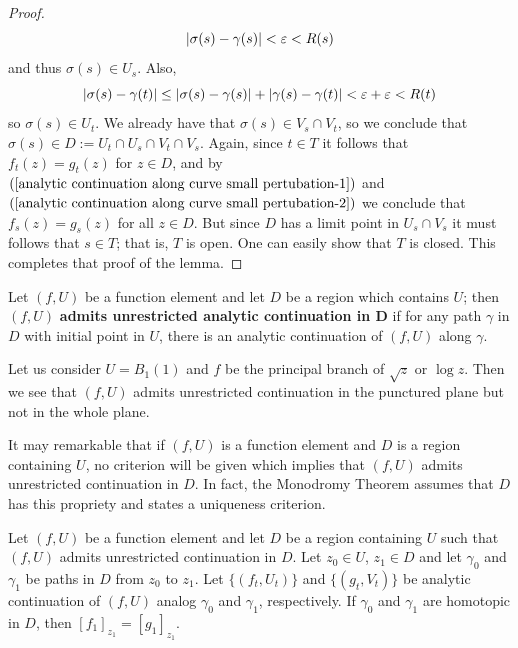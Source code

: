 \begin{proof}
\[|\sigma(s)-\gamma(s)|<\varepsilon<R(s)\]
and thus $\sigma(s)\in U_s$. Also,
\[|\sigma(s)-\gamma(t)|\leq|\sigma(s)-\gamma(s)|+|\gamma(s)-\gamma(t)|<\varepsilon+\varepsilon<R(t)\]
so $\sigma(s)\in U_t$. We already have that $\sigma(s)\in V_s\cap V_t$, so we conclude that $\sigma(s)\in D:=U_t\cap U_s\cap V_t\cap V_s$. Again, since $t\in T$ it follows that $f_t(z)=g_t(z)$ for $z\in D$, and by $(\ref{analytic continuation along curve small pertubation-1})$ and $(\ref{analytic continuation along curve small pertubation-2})$ we conclude that $f_s(z)=g_s(z)$ for all $z\in D$. But since $D$ has a limit point in $U_s\cap V_s$ it must follows that $s\in T$; that is, $T$ is open. One can easily show that $T$ is closed. This completes that proof of the lemma.
\end{proof}
\begin{definition}
Let $(f,U)$ be a function element and let $D$ be a region which contains $U$; then $(f,U)$ \textbf{admits unrestricted analytic continuation in $\bm{D}$} if for any path $\gamma$ in $D$ with initial point in $U$, there is an analytic continuation of $(f,U)$ along $\gamma$.
\end{definition}
Let us consider $U=B_{1}(1)$ and $f$ be the principal branch of $\sqrt{z}$ or $\log z$. Then we see that $(f,U)$ admits unrestricted continuation in the punctured plane but not in the whole plane.\par
It may remarkable that if $(f,U)$ is a function element and $D$ is a region containing $U$, no criterion will be given which implies that $(f,U)$ admits unrestricted continuation in $D$. In fact, the Monodromy Theorem assumes that $D$ has this propriety and states a uniqueness criterion.
\begin{theorem}\label{Monodromy Theorem}
Let $(f,U)$ be a function element and let $D$ be a region containing $U$ such that $(f,U)$ admits unrestricted continuation in $D$. Let $z_0\in U$, $z_1\in D$ and let $\gamma_0$ and $\gamma_1$ be paths in $D$ from $z_0$ to $z_1$. Let $\{(f_t,U_t)\}$ and $\{(g_t,V_t)\}$ be analytic continuation of $(f,U)$ analog $\gamma_0$ and $\gamma_1$, respectively. If $\gamma_0$ and $\gamma_1$ are homotopic in $D$, then $[f_1]_{z_1}=[g_1]_{z_1}$.
\end{theorem}
